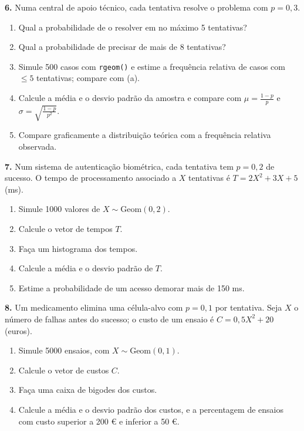 \documentclass[
  portuguese,
  11pt,
  openany]{book}
\providecommand{\tightlist}{%
  \setlength{\itemsep}{0pt}\setlength{\parskip}{0pt}}
\begin{document}
\textbf{6.} Numa central de apoio técnico, cada tentativa resolve o problema com \(p = 0{,}3\).

\begin{enumerate}
\def\labelenumi{(\alph{enumi})}
\tightlist
\item
  Qual a probabilidade de o resolver em no máximo 5 tentativas?
\item
  Qual a probabilidade de precisar de mais de 8 tentativas?
\item
  Simule 500 casos com \texttt{rgeom()} e estime a frequência relativa de casos com \(\leq 5\)
  tentativas; compare com (a).
\item
  Calcule a média e o desvio padrão da amostra e compare com \(\mu = \frac{1-p}{p}\) e
  \(\sigma = \sqrt{\frac{1-p}{p^2}}\).
\item
  Compare graficamente a distribuição teórica com a frequência relativa observada.
\end{enumerate}

\textbf{7.} Num sistema de autenticação biométrica, cada tentativa tem \(p = 0{,}2\) de
sucesso. O tempo de processamento associado a \(X\) tentativas é \(T = 2X^2 + 3X + 5\) (ms).

\begin{enumerate}
\def\labelenumi{(\alph{enumi})}
\tightlist
\item
  Simule 1000 valores de \(X \sim \text{Geom}(0{,}2)\).
\item
  Calcule o vetor de tempos \(T\).
\item
  Faça um histograma dos tempos.
\item
  Calcule a média e o desvio padrão de \(T\).
\item
  Estime a probabilidade de um acesso demorar mais de 150 ms.
\end{enumerate}

\textbf{8.} Um medicamento elimina uma célula-alvo com \(p = 0{,}1\) por tentativa. Seja \(X\) o
número de falhas antes do sucesso; o custo de um ensaio é \(C = 0{,}5X^2 + 20\) (euros).

\begin{enumerate}
\def\labelenumi{(\alph{enumi})}
\tightlist
\item
  Simule 5000 ensaios, com \(X \sim \text{Geom}(0{,}1)\).
\item
  Calcule o vetor de custos \(C\).
\item
  Faça uma caixa de bigodes dos custos.
\item
  Calcule a média e o desvio padrão dos custos, e a percentagem de ensaios com custo
  superior a 200 € e inferior a 50 €.
\end{enumerate}
\end{document}

